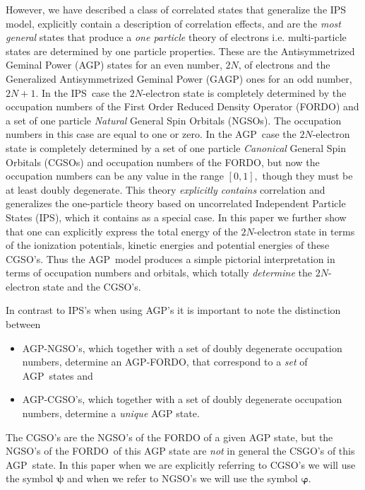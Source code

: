 \documentclass[aps,preprint]{revtex4}%
\begin{document}
However, we have described \cite{Weiner&ortiz04} a class of correlated states
that generalize the IPS model, explicitly contain a description of correlation
effects, and are the \emph{most general} states that produce a \emph{one
particle} theory of electrons i.e. multi-particle states are determined by one
particle properties. These are the Antisymmetrized Geminal Power (AGP) states
for an even number, $2N$, of electrons and the Generalized Antisymmetrized
Geminal Power (GAGP) ones for an odd number, $2N+1$. In the IPS\ case the
$2N$-electron state is completely determined by the occupation numbers of the
First Order Reduced Density Operator (FORDO) and a set of one particle
\emph{Natural }General Spin Orbitals (NGSOs). The occupation numbers in this
case are equal to one or zero. In the AGP\ case the $2N$-electron state is
completely determined by a set of one particle \emph{Canonical }General Spin
Orbitals (CGSOs) and occupation numbers of the FORDO, but now the occupation
numbers can be any value in the range $\left[  0,1\right]  ,$ though they must
be at least doubly degenerate. This theory \emph{explicitly contains}
correlation and generalizes the one-particle theory based on uncorrelated
Independent Particle States (IPS), which it contains as a special case. In
this paper we further show that one can explicitly express the total energy of
the $2N$-electron state in terms of the ionization potentials, kinetic
energies and potential energies of these CGSO's. Thus the AGP\ model produces
a simple pictorial interpretation in terms of occupation numbers and orbitals,
which totally \emph{determine} the $2N$-electron state and the CGSO's.

In contrast to IPS's when using AGP's it is important to note the distinction between

\begin{itemize}
\item AGP-NGSO's, which together with a set of doubly degenerate occupation
numbers, determine an AGP-FORDO, that correspond to a \emph{set }of
AGP\ states and

\item AGP-CGSO's, which together with a set of doubly degenerate occupation
numbers, determine a \emph{unique} AGP state.
\end{itemize}

The CGSO's are the NGSO's of the FORDO of a given AGP state, but the NGSO's of
the FORDO\ of this AGP state are \emph{not }in general the CSGO's of this
AGP\ state. In this paper when we are explicitly referring to CGSO's we will
use the symbol $\bm{\psi}$ and when we refer to NGSO's we will use the symbol
$\bm{\varphi.}$
\end{document}
